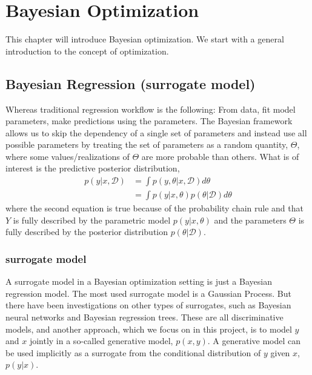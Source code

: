 \chapter{Bayesian Optimization}
This chapter will introduce Bayesian optimization. We start with a general introduction to 
the concept of optimization. 






\section{Bayesian Regression (surrogate model)}

Whereas traditional regression workflow is the following: From data, fit model parameters, make
predictions using the parameters. The Bayesian framework allows us to skip the dependency of a
single set of parameters and instead use all possible parameters by treating the set of parameters
as a random quantity, $\Theta$, where some values/realizations of $\Theta$ are more probable than
others. What is of interest is the predictive posterior distribution,  
\begin{align}\label{Predictive2}
    p(y|x, \mathcal{D}) &= \int p(y,\theta|x, \mathcal{D}) d\theta\\
    &= \int p(y|x,\theta)p(\theta|\mathcal{D}) d\theta
\end{align}
where the second equation is true because of the probability chain rule and that $Y$ is fully
described by the parametric model $p(y|x,\theta)$ and the parameters $\Theta$ is fully described by
the posterior distribution $p(\theta|\mathcal{D})$.

\subsection{surrogate model}
A surrogate model in a Bayesian optimization setting is just a Bayesian regression model. The most
used surrogate model is a Gaussian Process. But there have been investigations on other types of
surrogates, such as Bayesian neural networks and Bayesian regression trees. These are all
discriminative models, and another approach, which we focus on in this project, is to model $y$ and
$x$ jointly in a so-called generative model, $p(x,y)$. A generative model can be used implicitly
as a surrogate from the conditional distribution of $y$ given $x$, $p(y|x)$.

